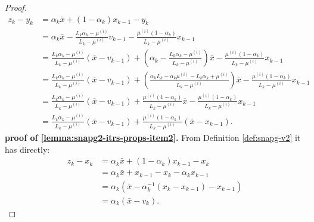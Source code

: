 \documentclass[12pt]{article}
\begin{document}
\begin{proof}
        \begin{align*}
            z_k - y_k &= 
            \alpha_k \bar x + (1 - \alpha_k)x_{k - 1} - y_k
            \\
            &= \alpha_k \bar x 
            - \frac{L_k\alpha_k - \mu^{(i)}}{L_k - \mu^{(i)}} v_{k - 1} 
            - \frac{\mu^{(i)}(1 - \alpha_k)}{L_k - \mu^{(i)}} x_{k - 1}
            \\
            &= \frac{L_k\alpha_k - \mu^{(i)}}{L_k - \mu^{(i)}}(\bar x - v_{k - 1})
            + \left(
                \alpha_k - \frac{L_k\alpha_k - \mu^{(i)}}{L_k - \mu^{(i)}}
            \right)\bar x
            - \frac{\mu^{(i)}(1 - \alpha_k)}{L_k - \mu^{(i)}} x_{k - 1}
            \\
            &= \frac{L_k\alpha_k - \mu^{(i)}}{L_k - \mu^{(i)}}(\bar x - v_{k - 1})
            + \left(
                \frac{\alpha_kL_k - \alpha_k \mu^{(i)} - L_k\alpha_k + \mu^{(i)}}{L_k - \mu^{(i)}}
            \right)\bar x
            - \frac{\mu^{(i)}(1 - \alpha_k)}{L_k - \mu^{(i)}} x_{k - 1}
            \\
            &= \frac{L_k\alpha_k - \mu^{(i)}}{L_k - \mu^{(i)}}(\bar x - v_{k - 1})
            + \frac{\mu^{(i)}(1 - \alpha_k)}{L_k - \mu^{(i)}}\bar x
            - \frac{\mu^{(i)}(1 - \alpha_k)}{L_k - \mu^{(i)}} x_{k - 1}
            \\
            &= \frac{L_k\alpha_k - \mu^{(i)}}{L_k - \mu^{(i)}}(\bar x - v_{k - 1})
            + \frac{\mu^{(i)}(1 - \alpha_k)}{L_k - \mu^{(i)}}(\bar x - x_{k - 1}).
        \end{align*}
        \textbf{proof of \ref{lemma:snapg2-itrs-props-item2}.}
        From Definition \ref{def:snapg-v2} it has directly: 
        \begin{align*}
            z_k - x_k &= \alpha_k \bar x + (1 - \alpha_k)x_{k - 1} - x_k
            \\
            &= \alpha_k \bar x + x_{k - 1} - x_k - \alpha_k x_{k - 1}
            \\
            &= \alpha_k(\bar x - \alpha_k^{-1}(x_k - x_{k - 1}) - x_{k - 1})
            \\
            &= \alpha_k (\bar x - v_k).
        \end{align*}

    \end{proof}
    \begin{lemma}\label{lemma:snagp2-one-step-s1-proto}
        
    \end{lemma}
\end{document}
